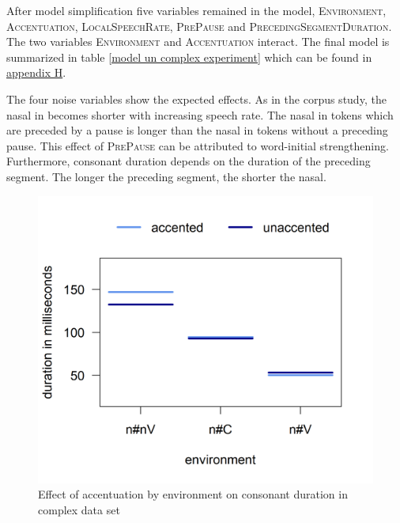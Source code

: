 After model simplification five variables remained in the model, \textsc{Environment}, \textsc{Accentuation}, \textsc{LocalSpeechRate}, \textsc{PrePause} and \textsc{PrecedingSegmentDuration}. The two variables \textsc{Environment} and \textsc{Accentuation} interact. The final model is summarized in table \ref{model un complex experiment} which can be found in \hyperref[Appendix H: Model Summaries Experiment]{appendix H}.


The four noise variables show the expected effects. As in the corpus study, the nasal in  becomes shorter with increasing speech rate. 
The nasal in tokens which are preceded by a pause is longer than the nasal in tokens without a preceding pause. This effect of \textsc{PrePause}  can be attributed to word-initial strengthening.  
Furthermore, consonant duration depends on the duration of the preceding segment. The longer the preceding segment, the shorter the nasal. 

\begin{figure} [t!]
	\centering
	\includegraphics [scale=0.5] {images/Experiment/unModelInterCatAcc}
	\caption{Effect of accentuation by environment on consonant duration in complex data set}
	\label{fig:NumNasal unComplex experiment}
\end{figure}


